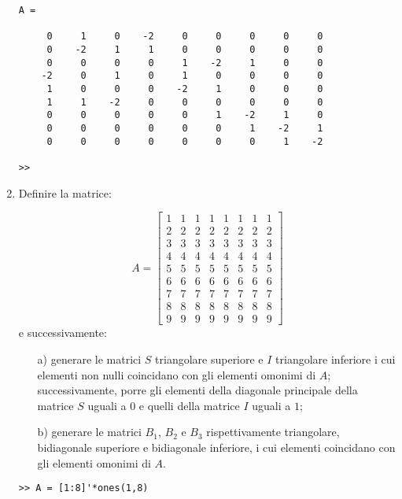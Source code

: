 \begin{enumerate}
\begin{svol}
\begin{codice}
\begin{verbatim}
A =

     0     1     0    -2     0     0     0     0     0
     0    -2     1     1     0     0     0     0     0
     0     0     0     0     1    -2     1     0     0
    -2     0     1     0     1     0     0     0     0
     1     0     0     0    -2     1     0     0     0
     1     1    -2     0     0     0     0     0     0
     0     0     0     0     0     1    -2     1     0
     0     0     0     0     0     0     1    -2     1
     0     0     0     0     0     0     0     1    -2

>> 

\end{verbatim}
\end{codice}
\end{svol}

\item Definire la matrice:

\[A =\left[
\begin{array}{cccccccc}
1 & 1 & 1 & 1 & 1 & 1 & 1 & 1\\
2 & 2 & 2 & 2 & 2 & 2 & 2 & 2\\
3 & 3 & 3 & 3 & 3 & 3 & 3 & 3\\
4 & 4 & 4 & 4 & 4 & 4 & 4 & 4\\
5 & 5 & 5 & 5 & 5 & 5 & 5 & 5\\
6 & 6 & 6 & 6 & 6 & 6 & 6 & 6\\
7 & 7 & 7 & 7 & 7 & 7 & 7 & 7\\
8 & 8 & 8 & 8 & 8 & 8 & 8 & 8\\
9 & 9 & 9 & 9 & 9 & 9 & 9 & 9
\end{array}\right]
\]
e successivamente:
\begin{itemize}
\item[a)] generare le matrici $S$ triangolare superiore e $I$ triangolare 
inferiore i cui elementi non nulli coincidano con gli elementi omonimi di $A$;
successivamente, porre gli elementi della diagonale principale della matrice $S$
uguali a $0$ e quelli della matrice $I$ uguali a $1$;
\item[b)]generare le matrici $B_1$, $B_2$ e $B_3$ rispettivamente triangolare,
bidiagonale superiore e bidiagonale inferiore, i cui elementi coincidano con
gli elementi omonimi di $A$.
\end{itemize}

\begin{svol}
\begin{codice}
\begin{verbatim}
>> A = [1:8]'*ones(1,8)


\end{verbatim}
\end{codice}
\end{svol}
\end{enumerate}
